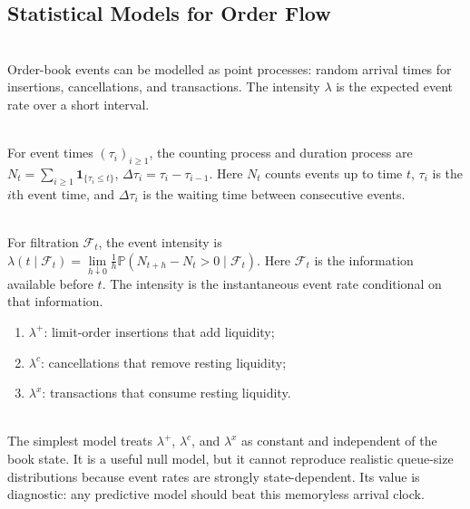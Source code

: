 \subsection{Statistical Models for Order Flow}

\begin{definition} \\
Order-book events can be modelled as point processes: random arrival times for insertions, cancellations, and transactions. The intensity $\lambda$ is the expected event rate over a short interval.
\end{definition}

\begin{definition} \\
For event times $(\tau_i)_{i\geq1}$, the counting process and duration process are $N_t=\sum\limits_{i\geq1}\mathbf{1}_{\{\tau_i\leq t\}}$, $\Delta\tau_i=\tau_i-\tau_{i-1}$. Here $N_t$ counts events up to time $t$, $\tau_i$ is the $i$th event time, and $\Delta\tau_i$ is the waiting time between consecutive events.
\end{definition}

\begin{definition} \\
For filtration $\mathcal{F}_t$, the event intensity is $\lambda(t\mid\mathcal{F}_t)=\lim\limits_{h\downarrow0}\frac{1}{h}\mathbb{P}(N_{t+h}-N_t>0\mid\mathcal{F}_t)$. Here $\mathcal{F}_t$ is the information available before $t$. The intensity is the instantaneous event rate conditional on that information.
\end{definition}

\begin{taxonomy} 
\begin{enumerate}[label=\roman*.]
\setlength{\itemsep}{0pt}
\item $\lambda^+$: limit-order insertions that add liquidity;
\item $\lambda^c$: cancellations that remove resting liquidity;
\item $\lambda^x$: transactions that consume resting liquidity.
\end{enumerate}
\end{taxonomy}

\begin{model} \\
The simplest model treats $\lambda^+$, $\lambda^c$, and $\lambda^x$ as constant and independent of the book state. It is a useful null model, but it cannot reproduce realistic queue-size distributions because event rates are strongly state-dependent. Its value is diagnostic: any predictive model should beat this memoryless arrival clock.
\end{model}

